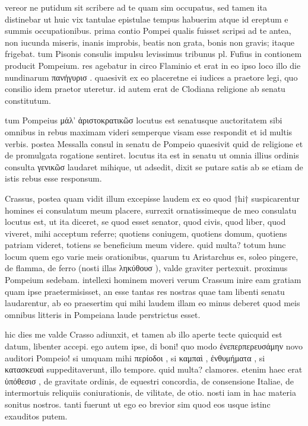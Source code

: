 


 vereor ne putidum sit scribere ad te quam sim occupatus, sed tamen ita distinebar ut huic vix tantulae epistulae tempus habuerim atque id ereptum e summis occupationibus. prima contio Pompei qualis fuisset scripsi ad te antea, non iucunda miseris, inanis improbis, beatis non grata, bonis non gravis; itaque frigebat. tum Pisonis consulis impulsu levissimus tribunus pl. Fufius in contionem producit Pompeium. res agebatur in circo Flaminio et erat in eo ipso loco illo die nundinarum πανήγυρισ . quaesivit ex eo placeretne ei iudices a praetore legi, quo consilio idem praetor uteretur. id autem erat de Clodiana religione ab senatu constitutum.

 tum Pompeius μάλ' ἀριστοκρατικῶσ locutus est senatusque auctoritatem sibi omnibus in rebus maximam videri semperque visam esse respondit et id multis verbis. postea Messalla consul in senatu de Pompeio quaesivit quid de religione et de promulgata rogatione sentiret. locutus ita est in senatu ut omnia illius ordinis consulta γενικῶσ laudaret mihique, ut adsedit, dixit se putare satis ab se etiam de istis rebus esse responsum.

 Crassus, postea quam vidit illum excepisse laudem ex eo quod †hi† suspicarentur homines ei consulatum meum placere, surrexit ornatissimeque de meo consulatu locutus est, ut ita diceret, se quod esset senator, quod civis, quod liber, quod viveret, mihi acceptum referre; quotiens coniugem, quotiens domum, quotiens patriam videret, totiens se beneficium meum videre. quid multa? totum hunc locum quem ego varie meis orationibus, quarum tu Aristarchus es, soleo pingere, de flamma, de ferro (nosti illas ληκύθουσ ), valde graviter pertexuit. proximus Pompeium sedebam. intellexi hominem moveri verum Crassum inire eam gratiam quam ipse praetermisisset, an esse tantas res nostras quae tam libenti senatu laudarentur, ab eo praesertim qui mihi laudem illam eo minus deberet quod meis omnibus litteris in Pompeiana laude perstrictus esset.

 hic dies me valde Crasso adiunxit, et tamen ab illo aperte tecte quicquid est datum, libenter accepi. ego autem ipse, di boni! quo modo ἐνεπερπερευσάμην novo auditori Pompeio! si umquam mihi περίοδοι , si καμπαὶ , ἐνθυμήματα , si κατασκευαὶ suppeditaverunt, illo tempore. quid multa? clamores. etenim haec erat ὑπόθεσισ , de gravitate ordinis, de equestri concordia, de consensione Italiae, de intermortuis reliquiis coniurationis, de vilitate, de otio. nosti iam in hac materia sonitus nostros. tanti fuerunt ut ego eo brevior sim quod eos usque istinc exauditos putem.

